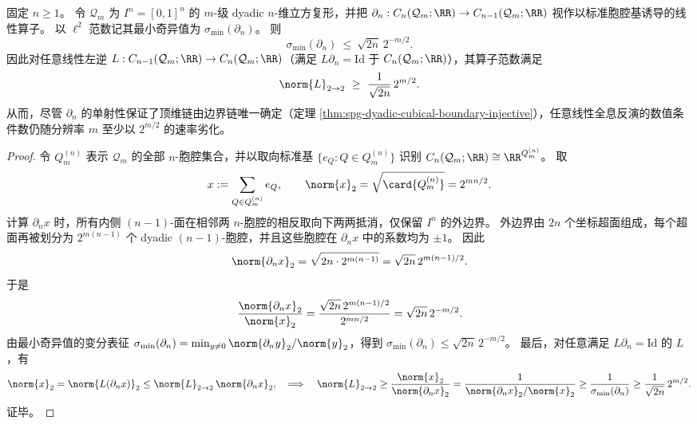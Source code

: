 \begin{theorem}\label{thm:spg-dyadic-top-dimensional-holographic-inversion-exponential-ill-conditioning}
固定 \(n\ge 1\)。
令 \(\mathcal Q_m\) 为 \(I^n=[0,1]^n\) 的 \(m\)-级 dyadic \(n\)-维立方复形，并把
\(\partial_n:C_n(\mathcal Q_m;\RR)\to C_{n-1}(\mathcal Q_m;\RR)\)
视作以标准胞腔基诱导的线性算子。
以 \(\ell^2\) 范数记其最小奇异值为 \(\sigma_{\min}(\partial_n)\)。
则
\[
\sigma_{\min}(\partial_n)\ \le\ \sqrt{2n}\,2^{-m/2}.
\]
因此对任意线性左逆 \(L:C_{n-1}(\mathcal Q_m;\RR)\to C_n(\mathcal Q_m;\RR)\)（满足 \(L\partial_n=\mathrm{Id}\) 于 \(C_n(\mathcal Q_m;\RR)\)），其算子范数满足
\[
\norm{L}_{2\to 2}\ \ge\ \frac{1}{\sqrt{2n}}\,2^{m/2}.
\]
从而，尽管 \(\partial_n\) 的单射性保证了顶维链由边界链唯一确定（定理 \ref{thm:spg-dyadic-cubical-boundary-injective}），任意线性全息反演的数值条件数仍随分辨率 \(m\) 至少以 \(2^{m/2}\) 的速率劣化。
\end{theorem}
\begin{proof}
令 \(Q_m^{(n)}\) 表示 \(\mathcal Q_m\) 的全部 \(n\)-胞腔集合，并以取向标准基 \(\{e_Q:Q\in Q_m^{(n)}\}\) 识别 \(C_n(\mathcal Q_m;\RR)\cong \RR^{Q_m^{(n)}}\)。
取
\[
x:=\sum_{Q\in Q_m^{(n)}} e_Q,
\qquad
\norm{x}_2=\sqrt{\card{Q_m^{(n)}}}=2^{mn/2}.
\]
计算 \(\partial_n x\) 时，所有内侧 \((n-1)\)-面在相邻两 \(n\)-胞腔的相反取向下两两抵消，仅保留 \(I^n\) 的外边界。
外边界由 \(2n\) 个坐标超面组成，每个超面再被划分为 \(2^{m(n-1)}\) 个 dyadic \((n-1)\)-胞腔，并且这些胞腔在 \(\partial_n x\) 中的系数均为 \(\pm 1\)。
因此
\[
\norm{\partial_n x}_2
=\sqrt{2n\cdot 2^{m(n-1)}}=\sqrt{2n}\,2^{m(n-1)/2}.
\]
于是
\[
\frac{\norm{\partial_n x}_2}{\norm{x}_2}
=\frac{\sqrt{2n}\,2^{m(n-1)/2}}{2^{mn/2}}
=\sqrt{2n}\,2^{-m/2}.
\]
由最小奇异值的变分表征 \(\sigma_{\min}(\partial_n)=\min_{y\neq 0}\norm{\partial_n y}_2/\norm{y}_2\)，得到 \(\sigma_{\min}(\partial_n)\le \sqrt{2n}\,2^{-m/2}\)。
最后，对任意满足 \(L\partial_n=\mathrm{Id}\) 的 \(L\)，有
\[
\norm{x}_2=\norm{L(\partial_n x)}_2\le \norm{L}_{2\to 2}\,\norm{\partial_n x}_2,
\quad\Longrightarrow\quad
\norm{L}_{2\to 2}\ge \frac{\norm{x}_2}{\norm{\partial_n x}_2}
=\frac{1}{\norm{\partial_n x}_2/\norm{x}_2}
\ge \frac{1}{\sigma_{\min}(\partial_n)}
\ge \frac{1}{\sqrt{2n}}\,2^{m/2}.
\]
证毕。
\end{proof}

\endinput
